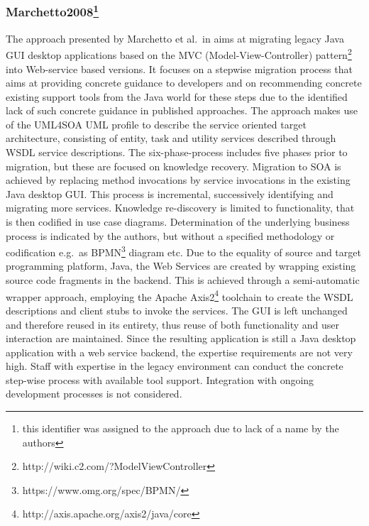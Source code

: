 \hypertarget{marchetto2008}{%
\subsubsection[Marchetto2008]{\texorpdfstring{Marchetto2008\footnote{this identifier was assigned to the approach due to lack of a name by the authors}}{Marchetto2008}}\label{marchetto2008}}

The approach presented by Marchetto et al.~in \autocite{Marchetto2008} aims at migrating legacy Java GUI desktop applications based on the MVC (Model-View-Controller) pattern\footnote{http://wiki.c2.com/?ModelViewController} into Web-service based versions.
It focuses on a stepwise migration process that aims at providing concrete guidance to developers and on recommending concrete existing support tools from the Java world for these steps due to the identified lack of such concrete guidance in published approaches.
The approach makes use of the UML4SOA UML profile to describe the service oriented target architecture, consisting of entity, task and utility services described through WSDL \autocite{W3C2007WSDL2.0} service descriptions.
The six-phase-process includes five phases prior to migration, but these are focused on knowledge recovery.
Migration to SOA is achieved by replacing method invocations by service invocations in the existing Java desktop GUI.
This process is incremental, successively identifying and migrating more services.
Knowledge re-discovery is limited to functionality, that is then codified in use case diagrams.
Determination of the underlying business process is indicated by the authors, but without a specified methodology or codification e.g.~as BPMN\footnote{https://www.omg.org/spec/BPMN/} diagram etc.
Due to the equality of source and target programming platform, Java, the Web Services are created by wrapping existing source code fragments in the backend.
This is achieved through a semi-automatic wrapper approach, employing the Apache Axis2\footnote{http://axis.apache.org/axis2/java/core} toolchain to create the WSDL descriptions and client stubs to invoke the services.
The GUI is left unchanged and therefore reused in its entirety, thus reuse of both functionality and user interaction are maintained.
Since the resulting application is still a Java desktop application with a web service backend, the expertise requirements are not very high.
Staff with expertise in the legacy environment can conduct the concrete step-wise process with available tool support.
Integration with ongoing development processes is not considered.

